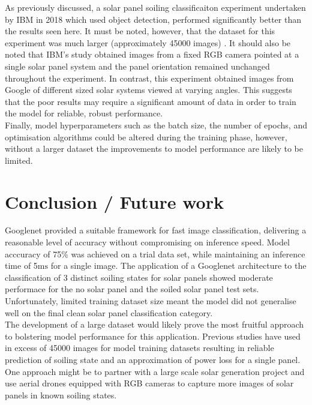 \documentclass[10pt,journal,compsoc]{IEEEtran}
\begin{document}
		As previously discussed, a solar panel soiling classificaiton experiment undertaken by IBM in 2018 which used object detection, performed significantly better than the results seen here. It must be noted, however, that the dataset for this experiment was much larger (approximately 45000 images) \cite{Mehta:2018}. It should also be noted that IBM's study obtained images from a fixed RGB camera pointed at a single solar panel system and the panel orientation remained unchanged throughout the experiment. In contrast, this experiment obtained images from Google of different sized solar systems viewed at varying angles. This suggests that the poor results may require a significant amount of data in order to train the model for reliable, robust performance.\\
		
		Finally, model hyperparameters such as the batch size, the number of epochs, and optimisation algorithms could be altered during the training phase, however, without a larger dataset the improvements to model performance are likely to be limited.
			
		\section{Conclusion / Future work}
		Googlenet provided a suitable framework for fast image classification, delivering a reasonable level of accuracy without compromising on inference speed. Model acccuracy of 75\% was achieved on a trial data set, while maintaining an inference time of 5$\si{\milli\second}$ for a single image. The application of a Googlenet architecture to the classification of 3 distinct soiling states for solar panels showed moderate performace for the no solar panel and the soiled solar panel test sets. Unfortunately, limited training dataset size meant the model did not generalise well on the final clean solar panel classification category.\\
		
		The development of a large dataset would likely prove the most fruitful approach to bolstering model performance for this application. Previous studies have used in excess of 45000 images for model training datasets resulting in reliable prediction of soiling state and an approximation of power loss for a single panel. One approach might be to partner with a large scale solar generation project and use aerial drones equipped with RGB cameras to capture more images of solar panels in known soiling states.
			
		
		
			
\end{document}
